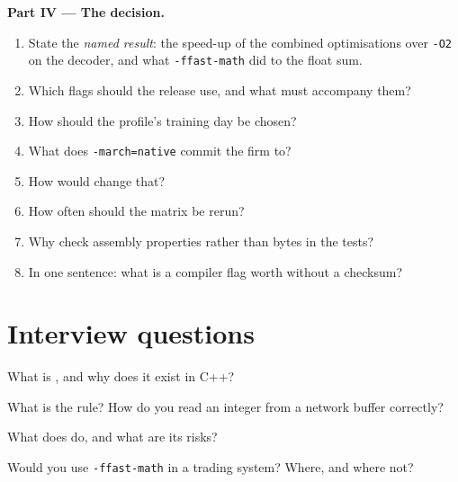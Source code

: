 \begin{problem}
\medskip\noindent\textbf{Part IV --- The decision.}
\begin{enumerate}[resume]
\item State the \emph{named result}: the speed-up of the combined optimisations over \texttt{-O2} on the decoder, and what
\texttt{-ffast-math} did to the float sum.
\item Which flags should the release use, and what must accompany them?
\item How should the profile's training day be chosen?
\item What does \texttt{-march=native} commit the firm to?
\item How would  change that?
\item How often should the matrix be rerun?
\item Why check assembly properties rather than bytes in the tests?
\item In one sentence: what is a compiler flag worth without a checksum?
\end{enumerate}
\end{problem}

\section{Interview questions}

\begin{interviewq}\label{iq:ll:cpp-for-latency-iii-the-compiler:1}
What is , and why does it exist in C++?
\end{interviewq}

\begin{interviewq}\label{iq:ll:cpp-for-latency-iii-the-compiler:2}
What is the  rule? How do you read an integer from a network buffer correctly?
\end{interviewq}

\begin{interviewq}\label{iq:ll:cpp-for-latency-iii-the-compiler:3}
What does  do, and what are its risks?
\end{interviewq}

\begin{interviewq}\label{iq:ll:cpp-for-latency-iii-the-compiler:4}
Would you use \texttt{-ffast-math} in a trading system? Where, and where not?
\end{interviewq}

